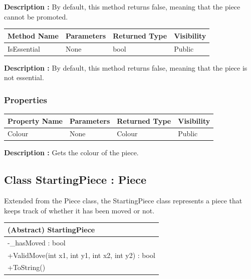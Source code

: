 \documentclass[12pt]{article}
\begin{document}
    \textbf{Description :} By default, this method returns false, meaning that the piece cannot be promoted.

\begin{table}[H]
    \begin{tabular}{|l|l|l|l|}
    \hline
    \rowcolor[HTML]{EFEFEF} 
    \cellcolor[HTML]{EFEFEF}\textbf{Method Name} & \textbf{Parameters}  & \textbf{Returned Type} & \textbf{Visibility} \\ \hline
    IsEssential                                  & None                 & bool                   & Public              \\ \hline
    \end{tabular}
\end{table}

    \textbf{Description :} By default, this method returns false, meaning that the piece is not essential.

\subsubsection{Properties}

\begin{table}[H]
    \begin{tabular}{|l|l|l|l|}
    \hline
    \rowcolor[HTML]{EFEFEF} 
    \cellcolor[HTML]{EFEFEF}\textbf{Property Name} & \textbf{Parameters}  & \textbf{Returned Type} & \textbf{Visibility} \\ \hline
    Colour                                         & None                 & Colour                 & Public              \\ \hline
    \end{tabular}
\end{table}

    \textbf{Description :} Gets the colour of the piece.
\newpage


\subsection{Class StartingPiece : Piece}

    Extended from the Piece class, the StartingPiece class represents a piece that keeps track of whether it has been moved or not.

\begin{table}[H]
    \begin{tabular}{|l|}
    \hline
    \cellcolor[HTML]{C0C0C0}\textbf{(Abstract) StartingPiece}            \\ \hline
    \cellcolor[HTML]{EFEFEF}-\_hasMoved : bool        \\ \hline
    +ValidMove(int x1, int y1, int x2, int y2) : bool \\ \hline
    +ToString()                                       \\ \hline
    \end{tabular}
\end{table}
\end{document}
